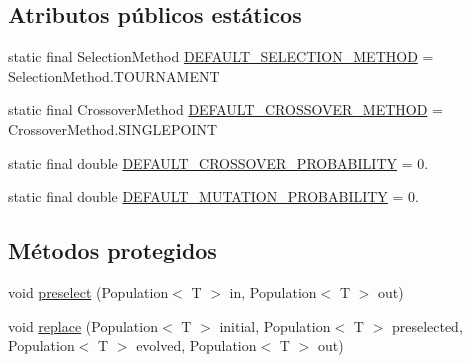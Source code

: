 \subsection*{Atributos públicos estáticos}
\begin{DoxyCompactItemize}
\item 
static final Selection\-Method \hyperlink{classjenes_1_1stage_1_1operator_1_1common_1_1_deterministic_crowder_3_01_t_01extends_01_chromosome_01_4_a5ca3f3abce0f3163383ed9158b154289}{D\-E\-F\-A\-U\-L\-T\-\_\-\-S\-E\-L\-E\-C\-T\-I\-O\-N\-\_\-\-M\-E\-T\-H\-O\-D} = Selection\-Method.\-T\-O\-U\-R\-N\-A\-M\-E\-N\-T
\item 
static final Crossover\-Method \hyperlink{classjenes_1_1stage_1_1operator_1_1common_1_1_deterministic_crowder_3_01_t_01extends_01_chromosome_01_4_aa09cba6e344d7681789f11213d6cccd0}{D\-E\-F\-A\-U\-L\-T\-\_\-\-C\-R\-O\-S\-S\-O\-V\-E\-R\-\_\-\-M\-E\-T\-H\-O\-D} = Crossover\-Method.\-S\-I\-N\-G\-L\-E\-P\-O\-I\-N\-T
\item 
static final double \hyperlink{classjenes_1_1stage_1_1operator_1_1common_1_1_deterministic_crowder_3_01_t_01extends_01_chromosome_01_4_a824ea51baffd4e4b2fb045d38b964321}{D\-E\-F\-A\-U\-L\-T\-\_\-\-C\-R\-O\-S\-S\-O\-V\-E\-R\-\_\-\-P\-R\-O\-B\-A\-B\-I\-L\-I\-T\-Y} = 0.
\item 
static final double \hyperlink{classjenes_1_1stage_1_1operator_1_1common_1_1_deterministic_crowder_3_01_t_01extends_01_chromosome_01_4_a5a4e77ddc158a661371ea5934cce2977}{D\-E\-F\-A\-U\-L\-T\-\_\-\-M\-U\-T\-A\-T\-I\-O\-N\-\_\-\-P\-R\-O\-B\-A\-B\-I\-L\-I\-T\-Y} = 0.
\end{DoxyCompactItemize}
\subsection*{Métodos protegidos}
\begin{DoxyCompactItemize}
\item 
void \hyperlink{classjenes_1_1stage_1_1operator_1_1common_1_1_deterministic_crowder_3_01_t_01extends_01_chromosome_01_4_aee04796d9d0ad969443b30cc88a1b964}{preselect} (Population$<$ T $>$ in, Population$<$ T $>$ out)
\item 
void \hyperlink{classjenes_1_1stage_1_1operator_1_1common_1_1_deterministic_crowder_3_01_t_01extends_01_chromosome_01_4_a8d9591e3962f36f1f2f59be9395806b4}{replace} (Population$<$ T $>$ initial, Population$<$ T $>$ preselected, Population$<$ T $>$ evolved, Population$<$ T $>$ out)
\end{DoxyCompactItemize}


